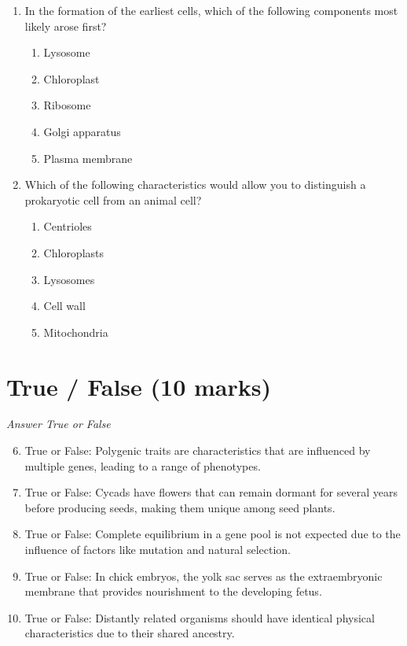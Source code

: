 \documentclass[12pt]{article}
\begin{document}
\begin{enumerate}[label=\arabic*.]
\begin{enumerate}[label=(\alph*)]
\end{enumerate}
\item In the formation of the earliest cells, which of the following components most likely arose first?
\begin{enumerate}[label=(\alph*)]
    \item Lysosome
    \item Chloroplast
    \item Ribosome
    \item Golgi apparatus
    \item Plasma membrane
\end{enumerate}
\item Which of the following characteristics would allow you to distinguish a prokaryotic cell from an animal cell?
\begin{enumerate}[label=(\alph*)]
    \item Centrioles
    \item Chloroplasts
    \item Lysosomes
    \item Cell wall
    \item Mitochondria
\end{enumerate}
\end{enumerate}

\section*{True / False (10 marks)}
\textit{Answer True or False}
\begin{enumerate}[label=\arabic*.]
\setcounter{enumi}{5}
\item True or False: Polygenic traits are characteristics that are influenced by multiple genes, leading to a range of phenotypes.
\item True or False: Cycads have flowers that can remain dormant for several years before producing seeds, making them unique among seed plants.
\item True or False: Complete equilibrium in a gene pool is not expected due to the influence of factors like mutation and natural selection.
\item True or False: In chick embryos, the yolk sac serves as the extraembryonic membrane that provides nourishment to the developing fetus.
\item True or False: Distantly related organisms should have identical physical characteristics due to their shared ancestry.
\end{enumerate}
\end{document}
